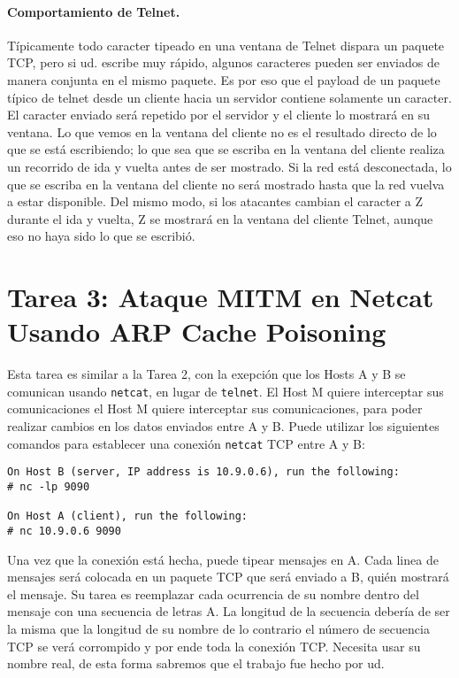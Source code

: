 \paragraph{Comportamiento de Telnet.}
Típicamente todo caracter tipeado en una ventana de Telnet dispara un paquete TCP, pero si ud. escribe muy rápido, algunos caracteres pueden ser enviados de manera conjunta en el mismo paquete.
Es por eso que el payload de un paquete típico de telnet desde un cliente hacia un servidor contiene solamente un caracter. El caracter enviado será repetido por el servidor y el cliente lo mostrará en su ventana. 
Lo que vemos en la ventana del cliente no es el resultado directo de lo que se está escribiendo; lo que sea que se escriba en la ventana del cliente realiza un recorrido de ida y vuelta antes de ser mostrado.
Si la red está desconectada, lo que se escriba en la ventana del cliente no será mostrado hasta que la red vuelva a estar disponible. 
Del mismo modo, si los atacantes cambian el caracter a Z durante el ida y vuelta, Z se mostrará en la ventana del cliente Telnet, aunque eso no haya sido lo que se escribió.


\section{Tarea 3: Ataque MITM en Netcat Usando ARP Cache Poisoning}

Esta tarea es similar a la Tarea 2, con la exepción que los Hosts A y B se comunican usando \texttt{netcat}, en lugar de \texttt{telnet}.
El Host M quiere interceptar sus comunicaciones el Host M quiere interceptar sus comunicaciones, para poder realizar cambios en los datos enviados entre A y B.
Puede utilizar los siguientes comandos para establecer una conexión \texttt{netcat} TCP entre A y B:


\begin{lstlisting}
On Host B (server, IP address is 10.9.0.6), run the following:
# nc -lp 9090

On Host A (client), run the following:
# nc 10.9.0.6 9090
\end{lstlisting}
 
Una vez que la conexión está hecha, puede tipear mensajes en A.
Cada linea de mensajes será colocada en un paquete TCP que será enviado a B, quién mostrará el mensaje.
Su tarea es reemplazar cada ocurrencia de su nombre dentro del mensaje con una secuencia de letras A. La longitud de la secuencia debería de ser la misma que la longitud de su nombre de lo contrario el número de secuencia TCP se verá corrompido y por ende toda la conexión TCP. Necesita usar su nombre real, de esta forma sabremos que el trabajo fue hecho por ud.


